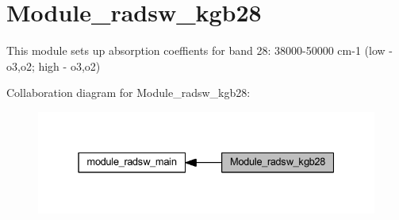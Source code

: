 \hypertarget{group__module__radsw__kgb28}{}\section{Module\+\_\+radsw\+\_\+kgb28}
\label{group__module__radsw__kgb28}


This module sets up absorption coeffients for band 28\+: 38000-\/50000 cm-\/1 (low -\/ o3,o2; high -\/ o3,o2)  


Collaboration diagram for Module\+\_\+radsw\+\_\+kgb28\+:\nopagebreak
\begin{figure}[H]
\begin{center}
\leavevmode
\includegraphics[width=331pt]{group__module__radsw__kgb28}
\end{center}
\end{figure}
